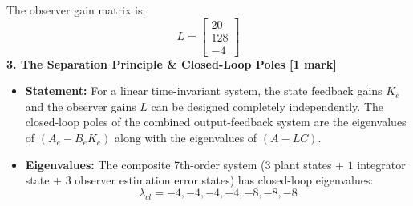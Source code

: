\documentclass[12pt,onecolumn,twoside ]{article}
\begin{document}
	The observer gain matrix is: \[
	L = \begin{bmatrix} 20 \\ 128 \\ -4 \end{bmatrix}
	\]
	\textbf{3. The Separation Principle \& Closed-Loop Poles [1 mark]}
	\begin{itemize}
		\item
		\textbf{Statement:} For a linear time-invariant system, the state feedback gains $K_e$ and the observer gains $L$ can be designed completely independently. The closed-loop poles of the combined output-feedback system are the eigenvalues of $(A_e - B_e K_e)$ along with the eigenvalues of $(A - LC)$.
		\item
		\textbf{Eigenvalues:} The composite 7th-order system ($3$ plant states + $1$ integrator state + $3$ observer estimation error states) has closed-loop eigenvalues: \[
		\lambda_{cl} = { -4, -4, -4, -4, -8, -8, -8 }
		\]
	\end{itemize}
	
\end{document}
